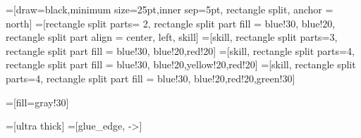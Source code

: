\usepackage{tikz}
\usepackage{xstring}
\usepackage{pgfplots}
\usepackage{etoolbox}
\usepackage{amssymb}
\usetikzlibrary{arrows,shapes}
\usetikzlibrary{positioning, calc}

=[draw=black,minimum size=25pt,inner sep=5pt, rectangle split, anchor = north]
=[rectangle split parts= 2, rectangle split part fill = {blue!30,
blue!20}, rectangle split part align = {center, left}, skill]
=[skill, rectangle split parts=3, rectangle split part fill = {blue!30, blue!20,red!20}]
=[skill, rectangle split parts=4, rectangle split part fill = {blue!30,
blue!20,yellow!20,red!20}]
=[skill, rectangle split parts=4, rectangle split part fill = {blue!30, blue!20,red!20,green!30}]

=[fill=gray!30]

=[ultra thick]
=[glue_edge, ->]

\newcommand{\drawskill}[4][]{
	\node[#1, skil_basic] (#2) {#3 \nodepart{second} #4};
}

\newcommand{\drawskilltest}[5][]{
	\node[#1, skill_test] (#2) {#3 \nodepart{second} $\diamond$ #4 \nodepart{third} $\circ$ #5};
}

\newcommand{\drawskillmaterialtest}[6][]{
	\node[#1, skill_material] (#2) {#3 \nodepart{second} $\diamond$ #4 \nodepart{third} $\to$ #5 \nodepart{fourth}
	$\circ$ #6};
}


